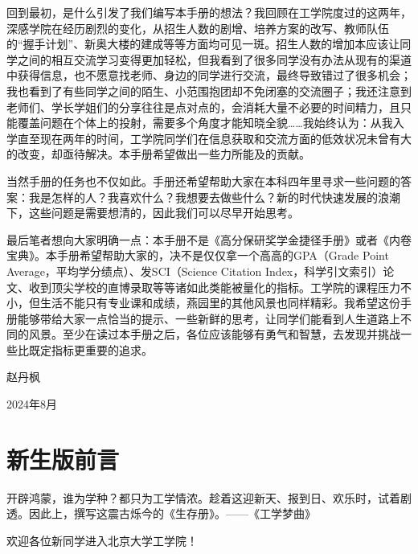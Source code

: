 \documentclass[11pt,oneside]{book}
\begin{document}
\vspace{10pt}

回到最初，是什么引发了我们编写本手册的想法？我回顾在工学院度过的这两年，深感学院在经历剧烈的变化，从招生人数的剧增、培养方案的改写、教师队伍的“握手计划”、新奥大楼的建成等等方面均可见一斑。招生人数的增加本应该让同学之间的相互交流学习变得更加轻松，但我看到了很多同学没有办法从现有的渠道中获得信息，也不愿意找老师、身边的同学进行交流，最终导致错过了很多机会；我也看到了有些同学之间的陌生、小范围抱团却不免闭塞的交流圈子；我还注意到老师们、学长学姐们的分享往往是点对点的，会消耗大量不必要的时间精力，且只能覆盖问题在个体上的投射，需要多个角度才能知晓全貌……我始终认为：从我入学直至现在两年的时间，工学院同学们在信息获取和交流方面的低效状况未曾有大的改变，却亟待解决。本手册希望做出一些力所能及的贡献。

\vspace{10pt}

当然手册的任务也不仅如此。手册还希望帮助大家在本科四年里寻求一些问题的答案：我是怎样的人？我喜欢什么？我想要去做些什么？新的时代快速发展的浪潮下，这些问题是需要想清的，因此我们可以尽早开始思考。

\vspace{10pt}

最后笔者想向大家明确一点：本手册不是《高分保研奖学金捷径手册》或者《内卷宝典》。本手册希望帮助大家的，决不是仅仅拿一个高高的GPA（Grade Point Average，平均学分绩点）、发SCI（Science Citation Index，科学引文索引）论文、收到顶尖学校的直博录取等等诸如此类能被量化的指标。工学院的课程压力不小，但生活不能只有专业课和成绩，燕园里的其他风景也同样精彩。我希望这份手册能够带给大家一点恰当的提示、一些新鲜的思考，让同学们能看到人生道路上不同的风景。至少在读过本手册之后，各位应该能够有勇气和智慧，去发现并挑战一些比既定指标更重要的追求。
\begin{flushright}
	赵丹枫
	
	2024年8月
\end{flushright}

\chapter*{新生版前言}
开辟鸿蒙，谁为学种？都只为工学情浓。趁着这迎新天、报到日、欢乐时，试着剧透。因此上，撰写这震古烁今的《生存册》。——《工学梦曲》

\vspace{10pt}

欢迎各位新同学进入北京大学工学院！

\vspace{10pt}
\end{document}
